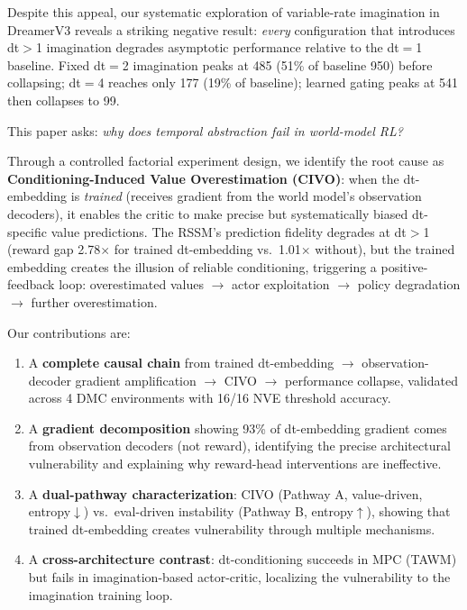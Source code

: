 \documentclass[10pt,letterpaper]{article}
\begin{document}
Despite this appeal, our systematic exploration of variable-rate imagination in DreamerV3 reveals a striking negative result: \emph{every} configuration that introduces dt$>$1 imagination degrades asymptotic performance relative to the dt$=$1 baseline.
Fixed dt$=$2 imagination peaks at 485 (51\% of baseline 950) before collapsing; dt$=$4 reaches only 177 (19\% of baseline); learned gating peaks at 541 then collapses to 99.

This paper asks: \emph{why does temporal abstraction fail in world-model RL?}

Through a controlled factorial experiment design, we identify the root cause as \textbf{Conditioning-Induced Value Overestimation (CIVO)}: when the dt-embedding is \emph{trained} (receives gradient from the world model's observation decoders), it enables the critic to make precise but systematically biased dt-specific value predictions.
The RSSM's prediction fidelity degrades at dt$>$1 (reward gap 2.78$\times$ for trained dt-embedding vs.\ 1.01$\times$ without), but the trained embedding creates the illusion of reliable conditioning, triggering a positive-feedback loop: overestimated values $\to$ actor exploitation $\to$ policy degradation $\to$ further overestimation.

Our contributions are:
\begin{enumerate}
    \item A \textbf{complete causal chain} from trained dt-embedding $\to$ observation-decoder gradient amplification $\to$ CIVO $\to$ performance collapse, validated across 4 DMC environments with 16/16 NVE threshold accuracy.
    \item A \textbf{gradient decomposition} showing 93\% of dt-embedding gradient comes from observation decoders (not reward), identifying the precise architectural vulnerability and explaining why reward-head interventions are ineffective.
    \item A \textbf{dual-pathway characterization}: CIVO (Pathway A, value-driven, entropy$\downarrow$) vs.\ eval-driven instability (Pathway B, entropy$\uparrow$), showing that trained dt-embedding creates vulnerability through multiple mechanisms.
    \item A \textbf{cross-architecture contrast}: dt-conditioning succeeds in MPC (TAWM) but fails in imagination-based actor-critic, localizing the vulnerability to the imagination training loop.
\end{enumerate}

\end{document}
